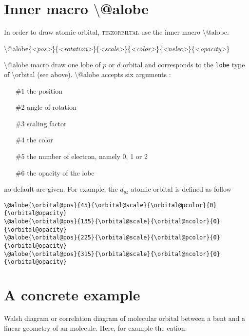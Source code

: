 \documentclass[10pt]{article}
\newcommand*{\cmd}[1]{{\ttfamily\color{blue!50!black}$\setminus$#1}\xspace}
\newcommand*{\marg}[1]{{\ttfamily\itshape\color{red!95!black}<#1>}\xspace}
\newcommand{\package}{\textsc{\sffamily\color{blue!50!black}tikzorbiltal}\xspace}
\begin{document}
\section{Inner macro \cmd{@alobe}}

In order to draw atomic orbital, \package use the inner macro \cmd{@alobe}.

\cmd{@alobe}\{\marg{pos}\}\{\marg{rotation}\}\{\marg{scale}\}\{\marg{color}\}\{\marg{nelec}\}\{\marg{opacity}\}

\cmd{@alobe} macro draw one lobe of $p$ or $d$ orbital and corresponds to the \texttt{lobe} type of \cmd{orbital} (see above). \cmd{@alobe} accepts six arguments :

\begin{enumerate}
     \item[\#1] the position
     \item[\#2] angle of rotation
     \item[\#3] scaling factor
     \item[\#4] the color
     \item[\#5] the number of electron, namely 0, 1 or 2
     \item[\#6] the opacity of the lobe
\end{enumerate}
%
no default are given. For example, the $d_{yz}$ atomic orbital is defined as follow

\begin{lstlisting}
\@alobe{\orbital@pos}{45}{\orbital@scale}{\orbital@pcolor}{0}{\orbital@opacity}   
\@alobe{\orbital@pos}{135}{\orbital@scale}{\orbital@ncolor}{0}{\orbital@opacity} 
\@alobe{\orbital@pos}{225}{\orbital@scale}{\orbital@pcolor}{0}{\orbital@opacity} 
\@alobe{\orbital@pos}{315}{\orbital@scale}{\orbital@ncolor}{0}{\orbital@opacity} 
\end{lstlisting}

\section{A concrete example}

Walsh diagram or correlation diagram of molecular orbital between a bent and a linear geometry of an  molecule. Here, for example the  cation.

    \def\lincoords{
        \coordinate (O) at (0,0);
        \coordinate (H1) at (.75, 0);
        \coordinate (H2) at (-.75, 0);
        \coordinate (label) at (0, -0.5);
   
        \draw (O) -- (H1);
        \draw (O) -- (H2);
    }
\end{document}
